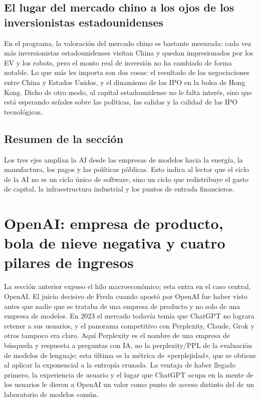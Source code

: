 \documentclass[a4paper]{article}
\begin{document}
\subsection{El lugar del mercado chino a los ojos de los inversionistas estadounidenses}

En el programa, la valoración del mercado chino es bastante mesurada: cada vez más inversionistas estadounidenses visitan China y quedan impresionados por los EV y los robots, pero el monto real de inversión no ha cambiado de forma notable. Lo que más les importa son dos cosas: el resultado de las negociaciones entre China y Estados Unidos, y el dinamismo de las IPO en la bolsa de Hong Kong. Dicho de otro modo, al capital estadounidense no le falta interés, sino que está esperando señales sobre las políticas, las salidas y la calidad de las IPO tecnológicas.

\subsection{Resumen de la sección}

Los tres ejes amplían la AI desde las empresas de modelos hacia la energía, la manufactura, los pagos y las políticas públicas. Esto indica al lector que el ciclo de la AI no es un ciclo único de software, sino un ciclo que redistribuye el gasto de capital, la infraestructura industrial y los puntos de entrada financieros.
\section{OpenAI: empresa de producto, bola de nieve negativa y cuatro pilares de ingresos}

La sección anterior expuso el hilo macroeconómico; esta entra en el caso central, OpenAI. El juicio decisivo de Freda cuando apostó por OpenAI fue haber visto antes que nadie que se trataba de una empresa de producto y no solo de una empresa de modelos. En 2023 el mercado todavía temía que ChatGPT no lograra retener a sus usuarios, y el panorama competitivo con Perplexity, Claude, Grok y otros tampoco era claro. Aquí Perplexity es el nombre de una empresa de búsqueda y respuesta a preguntas con IA, no la perplexity/PPL de la evaluación de modelos de lenguaje; esta última es la métrica de «perplejidad», que se obtiene al aplicar la exponencial a la entropía cruzada. La ventaja de haber llegado primero, la experiencia de usuario y el lugar que ChatGPT ocupa en la mente de los usuarios le dieron a OpenAI un valor como punto de acceso distinto del de un laboratorio de modelos común.
\end{document}

